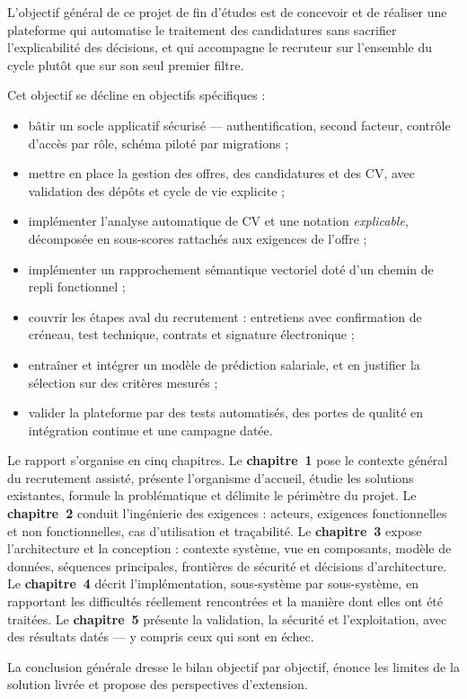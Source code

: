 L'objectif général de ce projet de fin d'études est de concevoir et de réaliser
une plateforme qui automatise le traitement des candidatures sans sacrifier
l'explicabilité des décisions, et qui accompagne le recruteur sur l'ensemble du
cycle plutôt que sur son seul premier filtre.

Cet objectif se décline en objectifs spécifiques :

\begin{itemize}[leftmargin=*]
  \item bâtir un socle applicatif sécurisé — authentification, second facteur,
        contrôle d'accès par rôle, schéma piloté par migrations ;
  \item mettre en place la gestion des offres, des candidatures et des CV,
        avec validation des dépôts et cycle de vie explicite ;
  \item implémenter l'analyse automatique de CV et une notation
        \emph{explicable}, décomposée en sous-scores rattachés aux exigences
        de l'offre ;
  \item implémenter un rapprochement sémantique vectoriel doté d'un chemin de
        repli fonctionnel ;
  \item couvrir les étapes aval du recrutement : entretiens avec confirmation
        de créneau, test technique, contrats et signature électronique ;
  \item entraîner et intégrer un modèle de prédiction salariale, et en
        justifier la sélection sur des critères mesurés ;
  \item valider la plateforme par des tests automatisés, des portes de qualité
        en intégration continue et une campagne datée.
\end{itemize}

Le rapport s'organise en cinq chapitres. Le \textbf{chapitre~1} pose le
contexte général du recrutement assisté, présente l'organisme d'accueil,
étudie les solutions existantes, formule la problématique et délimite le
périmètre du projet. Le \textbf{chapitre~2} conduit l'ingénierie des
exigences : acteurs, exigences fonctionnelles et non fonctionnelles, cas
d'utilisation et traçabilité. Le \textbf{chapitre~3} expose l'architecture et
la conception : contexte système, vue en composants, modèle de données,
séquences principales, frontières de sécurité et décisions d'architecture. Le
\textbf{chapitre~4} décrit l'implémentation, sous-système par sous-système, en
rapportant les difficultés réellement rencontrées et la manière dont elles ont
été traitées. Le \textbf{chapitre~5} présente la validation, la sécurité et
l'exploitation, avec des résultats datés — y compris ceux qui sont en échec.

La conclusion générale dresse le bilan objectif par objectif, énonce les
limites de la solution livrée et propose des perspectives d'extension.
